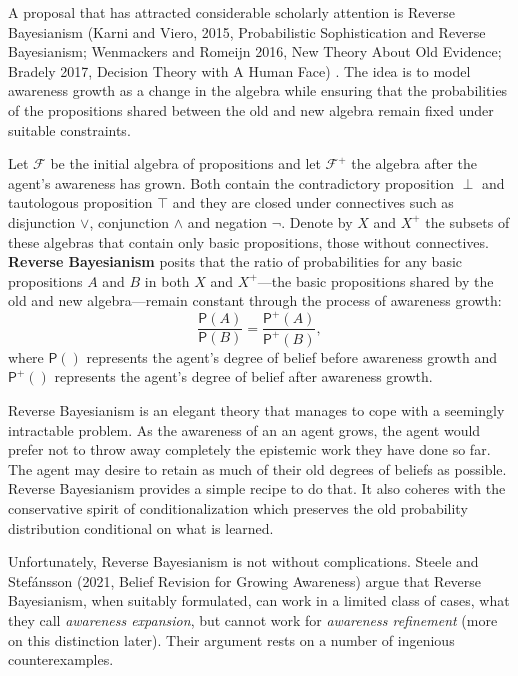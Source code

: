 \documentclass[
  11pt,
  dvipsnames,enabledeprecatedfontcommands]{scrartcl}
\newcommand{\pr}[1]{\ensuremath{\mathsf{P}(#1)}}
\newcommand{\ppr}[2]{\ensuremath{\mathsf{P}^{#1}(#2)}}
\begin{document}
A proposal that has attracted considerable scholarly attention is
Reverse Bayesianism (Karni and Viero, 2015, Probabilistic Sophistication
and Reverse Bayesianism; Wenmackers and Romeijn 2016, New Theory About
Old Evidence; Bradely 2017, Decision Theory with A Human Face) . The
idea is to model awareness growth as a change in the algebra while
ensuring that the probabilities of the propositions shared between the
old and new algebra remain fixed under suitable constraints.

Let \(\mathcal{F}\) be the initial algebra of propositions and let
\(\mathcal{F}^+\) the algebra after the agent's awareness has grown.
Both contain the contradictory proposition \(\perp\) and tautologous
proposition \(\top\) and they are closed under connectives such as
disjunction \(\vee\), conjunction \(\wedge\) and negation \(\neg\).
Denote by \(X\) and \(X^+\) the subsets of these algebras that contain
only basic propositions, those without connectives.
\textbf{Reverse Bayesianism} posits that the ratio of probabilities for
any basic propositions \(A\) and \(B\) in both \(X\) and \(X^+\)---the
basic propositions shared by the old and new algebra---remain constant
through the process of awareness growth:
\[\frac{\pr{A}}{\pr{B}} = \frac{\ppr{+}{A}}{\ppr{+}{B}},\] where
\(\pr{}\) represents the agent's degree of belief before awareness
growth and \(\ppr{+}{}\) represents the agent's degree of belief after
awareness growth.

Reverse Bayesianism is an elegant theory that manages to cope with a
seemingly intractable problem. As the awareness of an an agent grows,
the agent would prefer not to throw away completely the epistemic work
they have done so far. The agent may desire to retain as much of their
old degrees of beliefs as possible. Reverse Bayesianism provides a
simple recipe to do that. It also coheres with the conservative spirit
of conditionalization which preserves the old probability distribution
conditional on what is learned.

Unfortunately, Reverse Bayesianism is not without complications. Steele
and Stefánsson (2021, Belief Revision for Growing Awareness) argue that
Reverse Bayesianism, when suitably formulated, can work in a limited
class of cases, what they call \textit{awareness expansion}, but cannot
work for \textit{awareness refinement} (more on this distinction later).
Their argument rests on a number of ingenious counterexamples.
\end{document}
